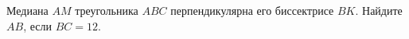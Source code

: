 \begin{ex}
	\begin{condition}
		Медиана \( AM \) треугольника \( ABC \) перпендикулярна его биссектрисе \( BK \). Найдите \( AB \), если \( BC = 12 \).
	\end{condition}
\end{ex}